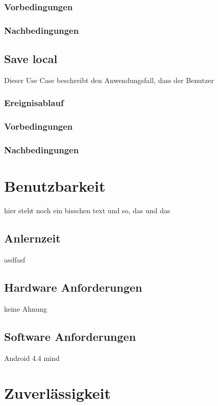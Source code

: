 		\subsubsection{Vorbedingungen}
			
		\subsubsection{Nachbedingungen}
	
	\subsection{Save local}
		Dieser Use Case beschreibt den Anwendungsfall, dass der Benutzer 
			
		\subsubsection{Ereignisablauf}
			
		\subsubsection{Vorbedingungen}
			
		\subsubsection{Nachbedingungen}	
	
\section{Benutzbarkeit}
hier steht noch ein bisschen text und so, das und das
	
	\subsection{Anlernzeit}
		asdfasf
	
	\subsection{Hardware Anforderungen}
		keine Ahnung
	
	\subsection{Software Anforderungen}
		Android 4.4 mind
		
\section{Zuverlässigkeit}
	
